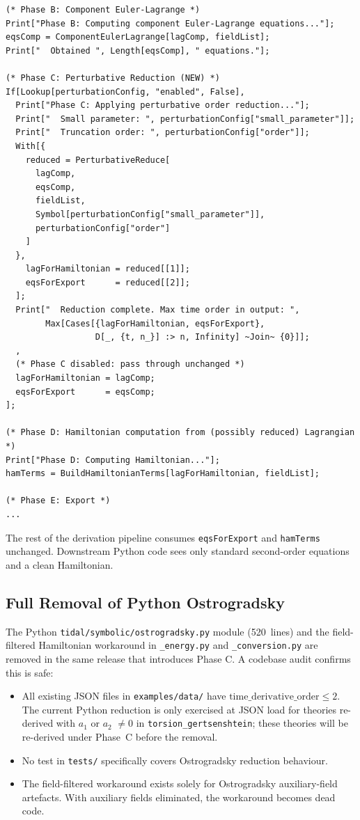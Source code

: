 \begin{verbatim}
(* Phase B: Component Euler-Lagrange *)
Print["Phase B: Computing component Euler-Lagrange equations..."];
eqsComp = ComponentEulerLagrange[lagComp, fieldList];
Print["  Obtained ", Length[eqsComp], " equations."];

(* Phase C: Perturbative Reduction (NEW) *)
If[Lookup[perturbationConfig, "enabled", False],
  Print["Phase C: Applying perturbative order reduction..."];
  Print["  Small parameter: ", perturbationConfig["small_parameter"]];
  Print["  Truncation order: ", perturbationConfig["order"]];
  With[{
    reduced = PerturbativeReduce[
      lagComp,
      eqsComp,
      fieldList,
      Symbol[perturbationConfig["small_parameter"]],
      perturbationConfig["order"]
    ]
  },
    lagForHamiltonian = reduced[[1]];
    eqsForExport      = reduced[[2]];
  ];
  Print["  Reduction complete. Max time order in output: ",
        Max[Cases[{lagForHamiltonian, eqsForExport},
                  D[_, {t, n_}] :> n, Infinity] ~Join~ {0}]];
  ,
  (* Phase C disabled: pass through unchanged *)
  lagForHamiltonian = lagComp;
  eqsForExport      = eqsComp;
];

(* Phase D: Hamiltonian computation from (possibly reduced) Lagrangian *)
Print["Phase D: Computing Hamiltonian..."];
hamTerms = BuildHamiltonianTerms[lagForHamiltonian, fieldList];

(* Phase E: Export *)
...
\end{verbatim}

The rest of the derivation pipeline consumes \texttt{eqsForExport} and \texttt{hamTerms} unchanged. Downstream Python code sees only standard second-order equations and a clean Hamiltonian.

\subsection{Full Removal of Python Ostrogradsky}
\label{sec:prd-removal}

The Python \texttt{tidal/symbolic/ostrogradsky.py} module (520~lines) and the field-filtered Hamiltonian workaround in \texttt{\_energy.py} and \texttt{\_conversion.py} are removed in the same release that introduces Phase C. A codebase audit confirms this is safe:
\begin{itemize}
  \item All existing JSON files in \texttt{examples/data/} have $\mathrm{time\_derivative\_order} \leq 2$. The current Python reduction is only exercised at JSON load for theories re-derived with $a_1$ or $a_2$ $\neq 0$ in \texttt{torsion\_gertsenshtein}; these theories will be re-derived under Phase~C before the removal.
  \item No test in \texttt{tests/} specifically covers Ostrogradsky reduction behaviour.
  \item The field-filtered workaround exists solely for Ostrogradsky auxiliary-field artefacts. With auxiliary fields eliminated, the workaround becomes dead code.
\end{itemize}

